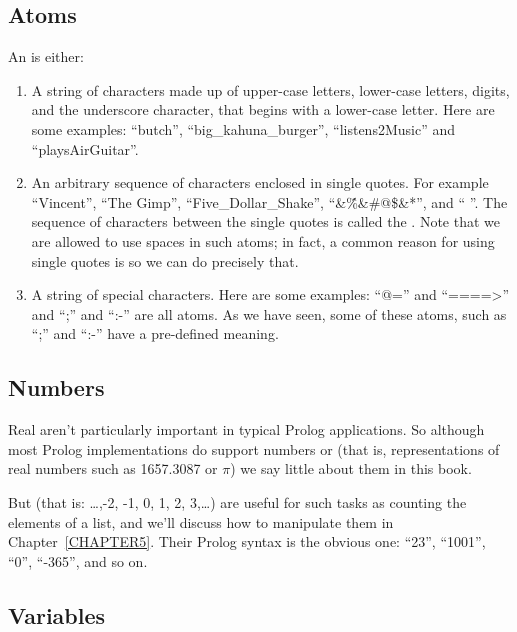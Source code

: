 \subsection*{Atoms}\label{SUBSEC.L1.ATOMS}

An  is either:

\begin{enumerate}
\item{}A string of characters made up of upper-case letters,
  lower-case letters, digits, and the underscore character, that
  begins with a lower-case letter.  Here are some examples: ``butch'',
  ``big\_kahuna\_burger'', ``listens2Music'' and ``playsAirGuitar''.
\item{}An arbitrary sequence of characters enclosed in single quotes.
  For example ``Vincent'', ``The Gimp'', ``Five\_Dollar\_Shake'',
  ``\&\^\%\&\#@\$\&*'', and `` ''.
  The sequence of characters between the single quotes is called the .
  Note that we are allowed to use spaces in such
  atoms; in fact, a common reason for using single quotes is so we
  can do precisely that.
\item{}A string of special characters.  Here are some examples: ``@='' and
  ``====>'' and ``;'' and ``:-'' are all atoms.  As we have seen, some of
  these atoms, such as ``;'' and ``:-'' have a pre-defined meaning.
\end{enumerate}


\subsection*{Numbers}\label{SUBSEC.L1.NUMBERS}


Real  aren't particularly important in typical Prolog
applications.  So although most Prolog implementations do support
 numbers or  (that is,
representations of real numbers such as 1657.3087 or $\pi$) we say
little about them in this book.

But  (that is: \ldots,-2, -1, 0, 1, 2, 3,\ldots) are
useful for such tasks as counting the elements of a list, and we'll
discuss how to manipulate them in Chapter~\ref{CHAPTER5}. Their Prolog
syntax is the obvious one: ``23'', ``1001'', ``0'', ``-365'', and so on.


\subsection*{Variables}\label{SUBSEC.L1.VARS}


